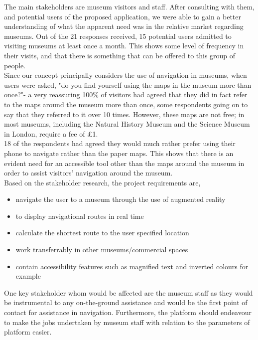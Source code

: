 
The main stakeholders are museum visitors and staff. After consulting with them, and potential users of the proposed application, we were able to gain a better understanding of what the apparent need was in the relative market regarding museums. Out of the 21 responses received, 15 potential users admitted to visiting museums at least once a month. This shows some level of frequency in their visits, and that there is something that can be offered to this group of people.\\

Since our concept principally considers the use of navigation in museums, when users were asked, "do you find yourself using the maps in the museum more than once?"- a very reassuring 100\% of visitors had agreed that they did in fact refer to the maps around the museum more than once, some respondents going on to say that they referred to it over 10 times. However, these maps are not free; in most museums, including the Natural History Museum and the Science Museum in London, require a fee of £1.\\

18 of the respondents had agreed they would much rather prefer using their phone to navigate rather than the paper maps. This shows that there is an evident need for an accessible tool other than the maps around the museum in order to assist visitors' navigation around the museum.\\

Based on the stakeholder research, the project requirements are, 

\begin{itemize}
    \item navigate the user to a museum through the use of augmented reality
    \item to display navigational routes in real time
    \item calculate the shortest route to the user specified location 
    \item work transferrably in other museums/commercial spaces
    \item contain accessibility features such as magnified text and inverted colours for example
\end{itemize}

One key stakeholder whom would be affected are the museum staff as they would be instrumental to any on-the-ground assistance and would be the first point of contact for assistance in navigation. Furthermore, the platform should endeavour to make the jobs undertaken by museum staff with relation to the parameters of platform easier.\\

